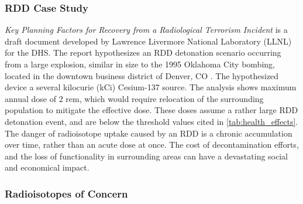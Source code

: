 \documentclass{report}
\begin{document}
 





\subsubsection{RDD Case Study}  \label{sec:case_study}

\emph{Key Planning Factors for Recovery from a Radiological Terrorism Incident} is a draft document developed by Lawrence Livermore National Laboratory (LLNL) for the DHS. The report hypothesizes an RDD detonation scenario occurring from a large explosion, similar in size to the 1995 Oklahoma City bombing, located in the downtown business district of Denver, CO \cite{Security2012}.  The hypothesized device a several kilocurie (kCi) Cesium-137 source.  The analysis shows maximum  annual dose of 2 rem, which would require relocation of the surrounding population to mitigate the effective dose.  These doses   assume a rather large RDD detonation event, and are below the threshold values cited in \autoref{tab:health_effects}.  The danger of radioisotope uptake caused by an RDD is a chronic accumulation over time, rather than an acute dose at once.  The cost of decontamination efforts, and the loss of functionality in surrounding areas can have a devastating social and economical impact.  
 


\subsubsection{Radioisotopes of Concern}
\end{document}
